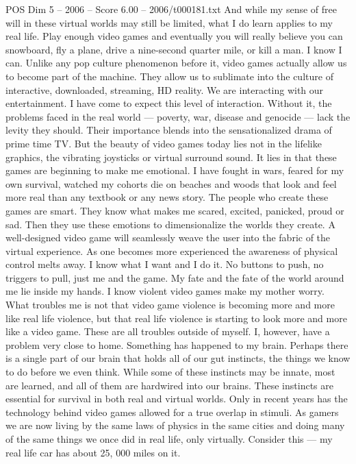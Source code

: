\begin{textsample}{POS Dim 5 – 2006 – Score 6.00 – 2006/t000181.txt}
And while my sense of free will in these virtual worlds may still be limited, what I do learn applies to my real life.
Play enough video games and eventually you will really believe you can snowboard, fly a plane, drive a nine-second quarter mile, or kill a man.
I know I can.
Unlike any pop culture phenomenon before it, video games actually allow us to become part of the machine.
They allow us to sublimate into the culture of interactive, downloaded, streaming, HD reality.
We are interacting with our entertainment.
I have come to expect this level of interaction.
Without it, the problems faced in the real world — poverty, war, disease and genocide — lack the levity they should.
Their importance blends into the sensationalized drama of prime time TV.
But the beauty of video games today lies not in the lifelike graphics, the vibrating joysticks or virtual surround sound.
It lies in that these games are beginning to make me emotional.
I have fought in wars, feared for my own survival, watched my cohorts die on beaches and woods that look and feel more real than any textbook or any news story.
The people who create these games are smart.
They know what makes me scared, excited, panicked, proud or sad.
Then they use these emotions to dimensionalize the worlds they create.
A well-designed video game will seamlessly weave the user into the fabric of the virtual experience.
As one becomes more experienced the awareness of physical control melts away.
I know what I want and I do it.
No buttons to push, no triggers to pull, just me and the game.
My fate and the fate of the world around me lie inside my hands.
I know violent video games make my mother worry.
What troubles me is not that video game violence is becoming more and more like real life violence, but that real life violence is starting to look more and more like a video game.
These are all troubles outside of myself.
I, however, have a problem very close to home.
Something has happened to my brain.
Perhaps there is a single part of our brain that holds all of our gut instincts, the things we know to do before we even think.
While some of these instincts may be innate, most are learned, and all of them are hardwired into our brains.
These instincts are essential for survival in both real and virtual worlds.
Only in recent years has the technology behind video games allowed for a true overlap in stimuli.
As gamers we are now living by the same laws of physics in the same cities and doing many of the same things we once did in real life, only virtually.
Consider this — my real life car has about 25, 000 miles on it.

\end{textsample}
